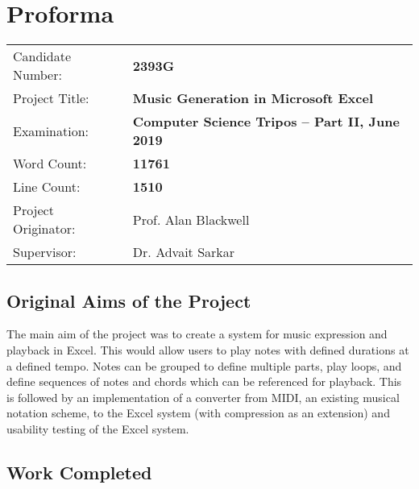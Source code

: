 \newpage

\chapter*{Proforma}

{\large
\begin{tabular}{ll}
Candidate Number:   & \bf 2393G                                \\
Project Title:      & \bf Music Generation in Microsoft Excel \\
Examination:        & \bf Computer Science Tripos -- Part II, June 2019  \\
Word Count:         & \bf 11761\footnotemark[1]  \\
Line Count:         & \bf 1510\footnotemark[2]  \\
Project Originator: & Prof. Alan Blackwell                    \\
Supervisor:         & Dr. Advait Sarkar                    \\
\end{tabular}
}


\section*{Original Aims of the Project}

The main aim of the project was to create a system for music expression and playback in Excel. This would allow users to play notes with defined durations at a defined tempo. Notes can be grouped to define multiple parts, play loops, and define sequences of notes and chords which can be referenced for playback. This is followed by an implementation of a converter from MIDI, an existing musical notation scheme, to the Excel system (with compression as an extension) and usability testing of the Excel system.

\section*{Work Completed}

